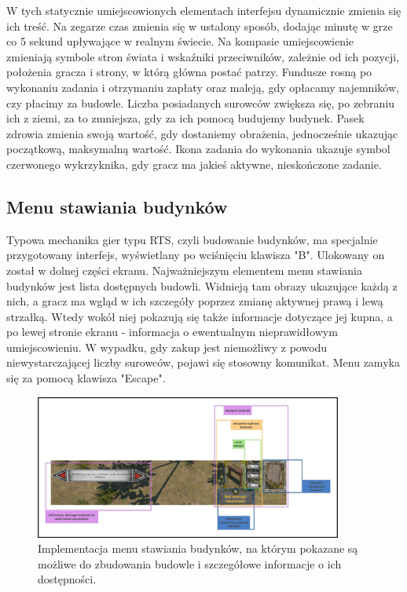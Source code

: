 W tych statycznie umiejscowionych elementach interfejsu dynamicznie zmienia się ich treść. Na zegarze czas zmienia się w ustalony sposób,
dodając minutę w grze co 5 sekund upływające w realnym świecie. Na kompasie umiejscowienie zmieniają symbole stron świata i wskaźniki przeciwników,
zależnie od ich pozycji, położenia gracza i strony, w którą główna postać patrzy. Fundusze rosną po wykonaniu zadania i otrzymaniu zapłaty oraz maleją, gdy opłacamy
najemników, czy płacimy za budowle. Liczba posiadanych surowców zwiększa się, po zebraniu ich z ziemi, za to zmniejsza, gdy za ich pomocą budujemy budynek.  
Pasek zdrowia zmienia swoją wartość, gdy dostaniemy obrażenia, jednocześnie ukazując początkową, maksymalną wartość. Ikona zadania do wykonania ukazuje symbol 
czerwonego wykrzyknika, gdy gracz ma jakieś aktywne, nieskończone zadanie.

\subsection{Menu stawiania budynków}
Typowa mechanika gier typu RTS, czyli budowanie budynków, ma specjalnie przygotowany interfejs, wyświetlany po wciśnięciu klawisza "B". 
Ulokowany on został w dolnej części ekranu. Najważniejszym elementem menu stawiania budynków jest lista dostępnych budowli. Widnieją tam 
obrazy ukazujące każdą z nich, a gracz ma wgląd w ich szczegóły poprzez zmianę aktywnej prawą i lewą strzałką. Wtedy wokół niej pokazują się także informacje dotyczące jej kupna,
a po lewej stronie ekranu - informacja o ewentualnym nieprawidłowym umiejscowieniu. W wypadku, gdy zakup jest niemożliwy z powodu niewystarczającej liczby 
surowców, pojawi się stosowny komunikat. Menu zamyka się za pomocą klawisza "Escape".
\begin{figure}[htbp]
    \centering
    \includegraphics[width=0.9\textwidth]{images/ui/opis_ekementow_budowanie.png}
    \caption{Implementacja menu stawiania budynków, na którym pokazane są możliwe do zbudowania budowle 
    i szczegółowe informacje o ich dostępności.
    }\label{fig:compass}
\end{figure}
\FloatBarrier

